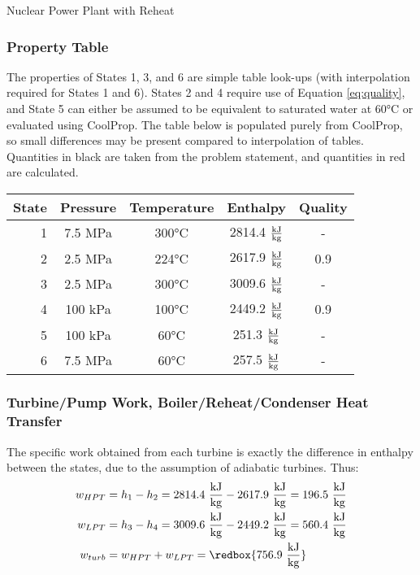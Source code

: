 \begin{example}[label=ex:RankineReheat]{Nuclear Power Plant with Reheat}
  \subsubsection*{Property Table}
  The properties of States 1, 3, and 6 are simple table look-ups (with interpolation required for States 1 and 6).  States 2 and 4 require use of Equation \ref{eq:quality}, and State 5 can either be assumed to be equivalent to saturated water at 60°C or evaluated using CoolProp.  The table below is populated purely from CoolProp, so small differences may be present compared to interpolation of tables.  Quantities in black are taken from the problem statement, and quantities in red are calculated.
  \begin{table}[H]
    \centering
    \def\arraystretch{1.5}
    \begin{tabular}{r|cccc}
      State & Pressure & Temperature & Enthalpy & Quality \\ \hline
      1 & 7.5 MPa & 300°C & {\color{Red} 2814.4 $\frac{\rm kJ}{\rm kg}$} & - \\
      2 & 2.5 MPa & {\color{Red} 224°C} & {\color{Red} 2617.9 $\frac{\rm kJ}{\rm kg}$} & 0.9 \\
      3 & 2.5 MPa & 300°C & {\color{Red} 3009.6 $\frac{\rm kJ}{\rm kg}$} & - \\
      4 & 100 kPa & {\color{Red} 100°C} & {\color{Red} 2449.2 $\frac{\rm kJ}{\rm kg}$} & 0.9 \\
      5 & 100 kPa & 60°C & {\color{Red} 251.3 $\frac{\rm kJ}{\rm kg}$} & - \\
      6 & 7.5 MPa & 60°C & {\color{Red} 257.5 $\frac{\rm kJ}{\rm kg}$} & - 
    \end{tabular}
    \def\arraystretch{1.0}
  \end{table}
  \subsubsection*{Turbine/Pump Work, Boiler/Reheat/Condenser Heat Transfer}
  The specific work obtained from each turbine is exactly the difference in enthalpy between the states, due to the assumption of adiabatic turbines.  Thus:
  \begin{align*}
    w_{HPT} &= h_1 - h_2 = 2814.4\ \frac{\rm kJ}{\rm kg} - 2617.9\ \frac{\rm kJ}{\rm kg} = 196.5\ \frac{\rm kJ}{\rm kg} \\
    w_{LPT} &= h_3 - h_4 = 3009.6\ \frac{\rm kJ}{\rm kg} - 2449.2\ \frac{\rm kJ}{\rm kg} = 560.4\ \frac{\rm kJ}{\rm kg} \\
    w_{turb} &= w_{HPT} + w_{LPT} = \redbox{756.9\ \frac{\rm kJ}{\rm kg}}
  \end{align*}


\end{example}
